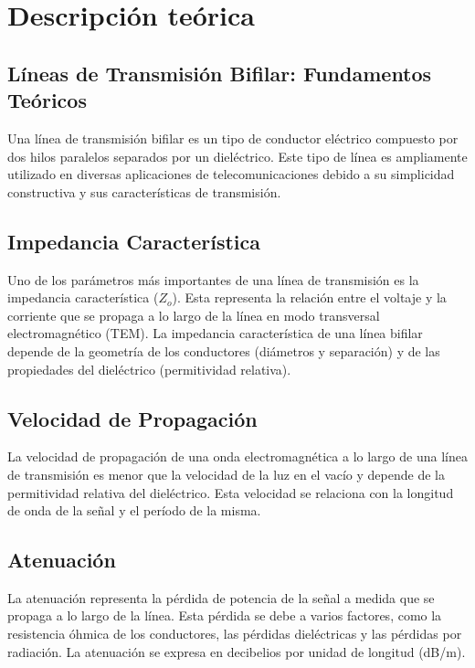 \section{Descripción teórica}

\subsection{Líneas de Transmisión Bifilar: Fundamentos Teóricos}

Una línea de transmisión bifilar es un tipo de conductor eléctrico compuesto por dos hilos paralelos separados por un dieléctrico. Este tipo de línea es ampliamente utilizado en diversas aplicaciones de telecomunicaciones debido a su simplicidad constructiva y sus características de transmisión.

\subsection{Impedancia Característica}

Uno de los parámetros más importantes de una línea de transmisión es la impedancia característica ($Z_o$). Esta representa la relación entre el voltaje y la corriente que se propaga a lo largo de la línea en modo transversal electromagnético (TEM). La impedancia característica de una línea bifilar depende de la geometría de los conductores (diámetros y separación) y de las propiedades del dieléctrico (permitividad relativa).

\subsection{Velocidad de Propagación}

La velocidad de propagación de una onda electromagnética a lo largo de una línea de transmisión es menor que la velocidad de la luz en el vacío y depende de la permitividad relativa del dieléctrico. Esta velocidad se relaciona con la longitud de onda de la señal y el período de la misma.

\subsection{Atenuación}

La atenuación representa la pérdida de potencia de la señal a medida que se propaga a lo largo de la línea. Esta pérdida se debe a varios factores, como la resistencia óhmica de los conductores, las pérdidas dieléctricas y las pérdidas por radiación. La atenuación se expresa en decibelios por unidad de longitud (dB/m).

